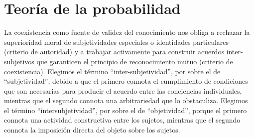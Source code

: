 \documentclass[a4paper,10pt]{book}
\theoremstyle{definition}
\begin{document}

\section{Teor\'ia de la probabilidad}\label{sec:principios_interculturales}

La coexistencia como fuente de validez del conocimiento nos obliga a rechazar la superioridad moral de subjetividades especiales o identidades particulares (criterio de autoridad) y a trabajar activamente para construir acuerdos inter-subjetivos que garanticen el principio de reconocimiento mutuo (criterio de coexistencia).
%
Elegimos el t\'ermino ``inter-subjetividad'', por sobre el de ``subjetividad'', debido a que el primero connota el cumplimiento de condiciones que son necesarias para producir el acuerdo entre las conciencias individuales, mientras que el segundo connota una arbitrariedad que lo obstaculiza.
%
Elegimos el t\'ermino ``intersubjetividad'', por sobre el de ``objetividad'', porque el primero connota una actividad constructiva entre los sujetos, mientras que el segundo connota la imposici\'on directa del objeto sobre los sujetos.

\end{document}
